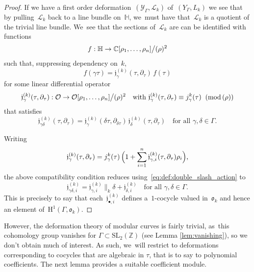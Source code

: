 \documentclass[10pt,a4paper]{article}
\numberwithin{equation}{section}
\let\oldbullet\bullet
\renewcommand{\bullet}{{\scriptscriptstyle\oldbullet}}
\theoremstyle{plain}
\theoremstyle{definition}
\newcommand{\tx}{\text}
\newcommand{\bbC}{\ensuremath{\mathbb{C}}}
\newcommand{\bbZ}{\ensuremath{\mathbb{Z}}}
\newcommand{\cL}{\ensuremath{\mathcal{L}}}
\newcommand{\cO}{\ensuremath{\mathcal{O}}}
\newcommand{\cY}{\ensuremath{\mathcal{Y}}}
\newcommand{\frakj}{\ensuremath{\mathfrak{j}}}
\newcommand{\frako}{\ensuremath{\mathfrak{o}}}
\newcommand{\rmH}{\ensuremath{\mathrm{H}}}
\newcommand{\defcol}{\mathrel{:}}
\renewcommand{\pmod}[1]{\;(\mathrm{mod}\, #1)}
\newcommand{\SL}[1]{\ensuremath{\mathrm{SL}_{#1}}}
\newcommand{\HS}{\ensuremath{\mathbb{H}}}
\let\Ga\Gamma
\let\ga\gamma
\begin{document}
\begin{proof}
If we have a first order deformation~$(\cY_\Ga,\cL_k)$ of~$(Y_\Ga,L_k)$ we see that by pulling~$\cL_k$ back to a line bundle on~$\HS$, we~must have that~$\cL_k$ is a quotient of the trivial line bundle. We~see that the sections of~$\cL_k$ are can be identified with functions
\begin{equation*}
f \defcol \HS \to \bbC [ \rho_1,\ldots,\rho_n ] \big\slash (\rho)^2
\end{equation*}
such that, suppressing dependency on~$k$,
\begin{equation*}
f(\ga\tau) = \frakj^{(k)}_\ga(\tau,\partial_\tau)\, f(\tau)
\end{equation*}
for some linear differential operator
\begin{equation*}
\frakj^{(k)}_\ga(\tau, \partial_\tau)
\defcol \cO \to \cO[ \rho_1,\ldots,\rho_n ] \big\slash (\rho)^2
\quad\tx{with\ }
\frakj^{(k)}_\ga(\tau,\partial_\tau)
\equiv
j_\ga^k(\tau)
\;\pmod{(\rho)}
\end{equation*}
that satisfies
\begin{equation*}
\frakj^{(k)}_{\ga\delta}(\tau,\partial_\tau)
=
\frakj^{(k)}_\ga(\delta\tau, \partial_{\delta \tau})\, \frakj^{(k)}_\delta(\tau,\partial_\tau)
\quad
\tx{for all\ }\ga, \delta \in \Ga
\tx{.}
\end{equation*}

Writing
\begin{equation}
\label{eq:first_order_deformation_cocycle_line_bundle_decomposition}
\frakj^{(k)}_\ga(\tau, \partial_\tau)
=
j^k_\ga(\tau)\,
\Bigl(1 + \sum_{i=1}^n \frakj^{(k)}_{\ga,i}(\tau, \partial_\tau) \rho_i \Bigr)
\tx{,}
\end{equation}
the above compatibility condition reduces using~\eqref{eq:def:double_slash_action} to
\begin{equation}
\label{eq:first_order_deformation_cocycle_line_bundle_relations}
\frakj^{(k)}_{\ga\delta, i}
=
\frakj^{(k)}_{\ga,i}\big\|_k \delta + \frakj^{(k)}_{\delta,i}
\quad
\tx{for all\ }
\ga,\delta\in\Ga
\tx{.}
\end{equation}
This is precisely to say that each~$\frakj^{(k)}_{\bullet,i}$ defines a~$1$-cocycle valued in~$\frako_k$ and hence an element of~$\rmH^1(\Ga,\frako_k)$.
\end{proof}
However, the deformation theory of modular curves is fairly trivial, as~this cohomology group vanishes for $\Ga\subset \SL2(\bbZ)$ (see Lemma \ref{lem:vanishing}), so we don't obtain much of interest. As such, we~will restrict to deformations corresponding to cocycles that are algebraic in $\tau$, that is to say to polynomial coefficients. The next lemma provides a suitable coefficient module.
\end{document}
